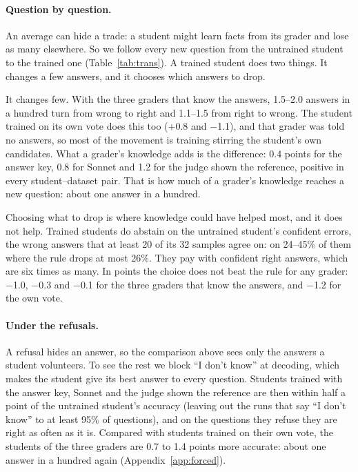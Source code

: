 \documentclass[11pt,a4paper,twocolumn]{article}
\newcommand{\idk}{``I don't know''}
\begin{document}
\paragraph{Question by question.} An average can hide a trade: a student might learn facts from its grader and lose as many elsewhere. So we follow every new question from the untrained student to the trained one (Table~\ref{tab:trans}). A trained student does two things. It changes a few answers, and it chooses which answers to drop.

It changes few. With the three graders that know the answers, 1.5--2.0 answers in a hundred turn from wrong to right and 1.1--1.5 from right to wrong. The student trained on its own vote does this too ($+$0.8 and $-$1.1), and that grader was told no answers, so most of the movement is training stirring the student's own candidates. What a grader's knowledge adds is the difference: 0.4 points for the answer key, 0.8 for Sonnet and 1.2 for the judge shown the reference, positive in every student--dataset pair. That is how much of a grader's knowledge reaches a new question: about one answer in a hundred.

Choosing what to drop is where knowledge could have helped most, and it does not help. Trained students do abstain on the untrained student's confident errors, the wrong answers that at least 20 of its 32 samples agree on: on 24--45\% of them where the rule drops at most 26\%. They pay with confident right answers, which are six times as many. In points the choice does not beat the rule for any grader: $-$1.0, $-$0.3 and $-$0.1 for the three graders that know the answers, and $-$1.2 for the own vote.

\paragraph{Under the refusals.} A refusal hides an answer, so the comparison above sees only the answers a student volunteers. To see the rest we block \idk{} at decoding, which makes the student give its best answer to every question. Students trained with the answer key, Sonnet and the judge shown the reference are then within half a point of the untrained student's accuracy (leaving out the runs that say \idk{} to at least 95\% of questions), and on the questions they refuse they are right as often as it is. Compared with students trained on their own vote, the students of the three graders are 0.7 to 1.4 points more accurate: about one answer in a hundred again (Appendix~\ref{app:forced}).
\end{document}
